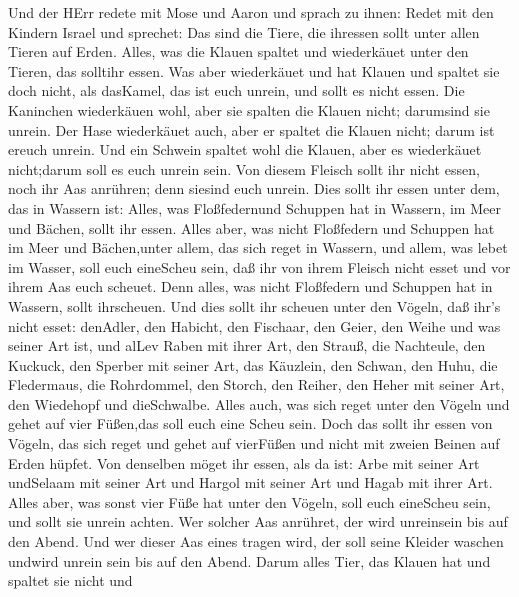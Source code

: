  Und der HErr redete mit Mose und Aaron und sprach zu ihnen:
 Redet mit den Kindern Israel und sprechet: Das sind die
Tiere, die ihressen sollt unter allen Tieren auf Erden. 
Alles, was die Klauen spaltet und wiederkäuet unter den Tieren, das
solltihr essen.  Was aber wiederkäuet und hat Klauen und
spaltet sie doch nicht, als dasKamel, das ist euch unrein, und sollt es
nicht essen.  Die Kaninchen wiederkäuen wohl, aber sie
spalten die Klauen nicht; darumsind sie unrein.  Der Hase
wiederkäuet auch, aber er spaltet die Klauen nicht; darum ist ereuch
unrein.  Und ein Schwein spaltet wohl die Klauen, aber es
wiederkäuet nicht;darum soll es euch unrein sein.  Von
diesem Fleisch sollt ihr nicht essen, noch ihr Aas anrühren; denn
siesind euch unrein.  Dies sollt ihr essen unter dem, das in
Wassern ist: Alles, was Floßfedernund Schuppen hat in Wassern, im Meer
und Bächen, sollt ihr essen.  Alles aber, was nicht
Floßfedern und Schuppen hat im Meer und Bächen,unter allem, das sich
reget in Wassern, und allem, was lebet im Wasser, soll euch eineScheu
sein,  daß ihr von ihrem Fleisch nicht esset und vor ihrem
Aas euch scheuet.  Denn alles, was nicht Floßfedern und
Schuppen hat in Wassern, sollt ihrscheuen.  Und dies sollt
ihr scheuen unter den Vögeln, daß ihr's nicht esset: denAdler, den
Habicht, den Fischaar,  den Geier, den Weihe und was seiner
Art ist,  und alLev Raben mit ihrer Art,  den
Strauß, die Nachteule, den Kuckuck, den Sperber mit seiner Art,
 das Käuzlein, den Schwan, den Huhu,  die
Fledermaus, die Rohrdommel,  den Storch, den Reiher, den
Heher mit seiner Art, den Wiedehopf und dieSchwalbe.  Alles
auch, was sich reget unter den Vögeln und gehet auf vier Füßen,das soll
euch eine Scheu sein.  Doch das sollt ihr essen von Vögeln,
das sich reget und gehet auf vierFüßen und nicht mit zweien Beinen auf
Erden hüpfet.  Von denselben möget ihr essen, als da ist:
Arbe mit seiner Art undSelaam mit seiner Art und Hargol mit seiner Art
und Hagab mit ihrer Art.  Alles aber, was sonst vier Füße
hat unter den Vögeln, soll euch eineScheu sein,  und sollt
sie unrein achten. Wer solcher Aas anrühret, der wird unreinsein bis auf
den Abend.  Und wer dieser Aas eines tragen wird, der soll
seine Kleider waschen undwird unrein sein bis auf den Abend.
 Darum alles Tier, das Klauen hat und spaltet sie nicht und
